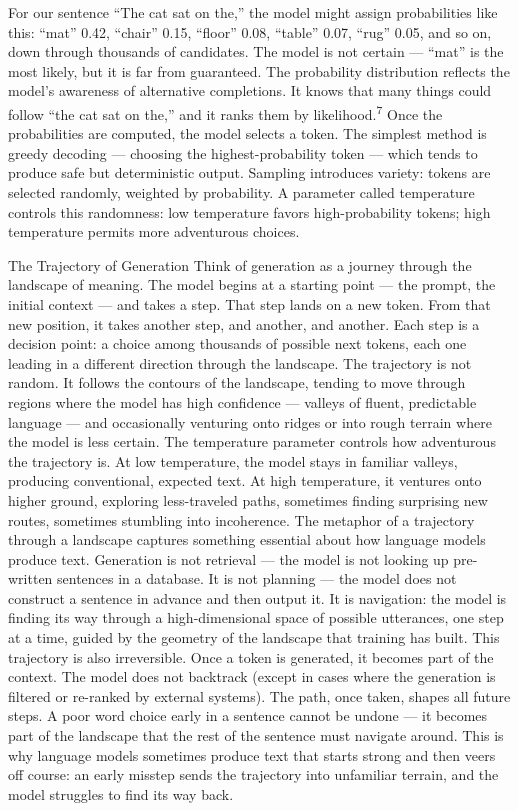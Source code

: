 For our sentence “The cat sat on the,” the model might assign probabilities like this: “mat” 0.42, “chair” 0.15, “floor” 0.08, “table” 0.07, “rug” 0.05, and so on, down through thousands of candidates. The model is not certain — “mat” is the most likely, but it is far from guaranteed. The probability distribution reflects the model’s awareness of alternative completions. It knows that many things could follow “the cat sat on the,” and it ranks them by likelihood.\textsuperscript{7} Once the probabilities are computed, the model selects a token. The simplest method is greedy decoding — choosing the highest-probability token — which tends to produce safe but deterministic output. Sampling introduces variety: tokens are selected randomly, weighted by probability. A parameter called temperature controls this randomness: low temperature favors high-probability tokens; high temperature permits more adventurous choices.

The Trajectory of Generation Think of generation as a journey through the landscape of meaning. The model begins at a starting point — the prompt, the initial context — and takes a step. That step lands on a new token. From that new position, it takes another step, and another, and another. Each step is a decision point: a choice among thousands of possible next tokens, each one leading in a different direction through the landscape. The trajectory is not random. It follows the contours of the landscape, tending to move through regions where the model has high confidence — valleys of fluent, predictable language — and occasionally venturing onto ridges or into rough terrain where the model is less certain. The temperature parameter controls how adventurous the trajectory is. At low temperature, the model stays in familiar valleys, producing conventional, expected text. At high temperature, it ventures onto higher ground, exploring less-traveled paths, sometimes finding surprising new routes, sometimes stumbling into incoherence. The metaphor of a trajectory through a landscape captures something essential about how language models produce text. Generation is not retrieval — the model is not looking up pre-written sentences in a database. It is not planning — the model does not construct a sentence in advance and then output it. It is navigation: the model is finding its way through a high-dimensional space of possible utterances, one step at a time, guided by the geometry of the landscape that training has built. This trajectory is also irreversible. Once a token is generated, it becomes part of the context. The model does not backtrack (except in cases where the generation is filtered or re-ranked by external systems). The path, once taken, shapes all future steps. A poor word choice early in a sentence cannot be undone — it becomes part of the landscape that the rest of the sentence must navigate around. This is why language models sometimes produce text that starts strong and then veers off course: an early misstep sends the trajectory into unfamiliar terrain, and the model struggles to find its way back.

